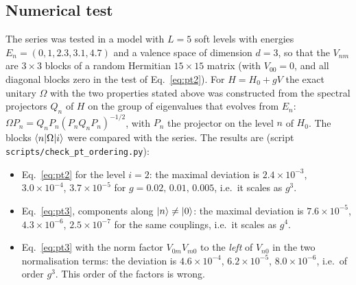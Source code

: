 \subsection{Numerical test}\label{app:pt_num}

The series was tested in a model with $L=5$ soft levels with energies $E_n=(0,1,2.3,3.1,4.7)$ and a valence space of dimension $d=3$, so that the $V_{nm}$ are $3\times3$ blocks of a random Hermitian $15\times15$ matrix (with $V_{00}=0$, and all diagonal blocks zero in the test of Eq.~\eqref{eq:pt2}). For $H=H_0+gV$ the exact unitary $\Omega$ with the two properties stated above was constructed from the spectral projectors $Q_n$ of $H$ on the group of eigenvalues that evolves from $E_n$: $\Omega P_n=Q_nP_n(P_nQ_nP_n)^{-1/2}$, with $P_n$ the projector on the level $n$ of $H_0$. The blocks $\braket{n|\Omega|i}$ were compared with the series. The results are (script \texttt{scripts/check\_pt\_ordering.py}):
\begin{itemize}
\item Eq.~\eqref{eq:pt2} for the level $i=2$: the maximal deviation is $2.4\times10^{-3}$, $3.0\times10^{-4}$, $3.7\times10^{-5}$ for $g=0.02,\,0.01,\,0.005$, i.e.\ it scales as $g^3$.
\item Eq.~\eqref{eq:pt3}, components along $\ket n\ne\ket0$: the maximal deviation is $7.6\times10^{-5}$, $4.3\times10^{-6}$, $2.5\times10^{-7}$ for the same couplings, i.e.\ it scales as $g^4$.
\item Eq.~\eqref{eq:pt3} with the norm factor $V_{0m}V_{m0}$ to the \emph{left} of $V_{n0}$ in the two normalisation terms: the deviation is $4.6\times10^{-4}$, $6.2\times10^{-5}$, $8.0\times10^{-6}$, i.e.\ of order $g^3$. This order of the factors is wrong.
\end{itemize}
